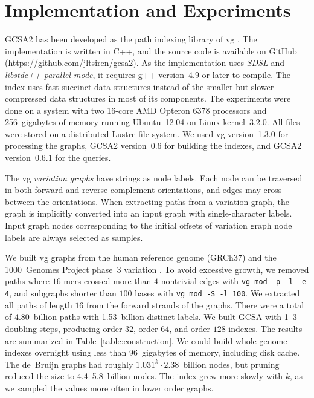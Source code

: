 \documentclass[a4paper,UKenglish]{lipics-v2016}
\newcommand{\kmer}[1]{$#1$\nobreakdash-mer}
\newcommand{\orderk}[1]{order\nobreakdash-$#1$}
\begin{document}
\section{Implementation and Experiments}

GCSA2 has been developed as the path indexing library of vg \cite{Garrison2014-2016}. The implementation is written in C++, and the source code is available on GitHub (\url{https://github.com/jltsiren/gcsa2}). As the implementation uses \emph{SDSL} \cite{Gog2014b} and \emph{libstdc++ parallel mode}, it requires g++ version~4.9 or later to compile. The index uses fast succinct data structures instead of the smaller but slower compressed data structures in most of its components. The experiments were done on a system with two 16\nobreakdash-core AMD Opteron 6378 processors and 256~gigabytes of memory running Ubuntu~12.04 on Linux kernel~3.2.0. All files were stored on a distributed Lustre file system. We used vg version~1.3.0 for processing the graphs, GCSA2 version~0.6 for building the indexes, and GCSA2 version~0.6.1 for the queries.

The vg \emph{variation graphs} have strings as node labels. Each node can be traversed in both forward and reverse complement orientations, and edges may cross between the orientations. When extracting paths from a variation graph, the graph is implicitly converted into an input graph with single-character labels. Input graph nodes corresponding to the initial offsets of variation graph node labels are always selected as samples.

We built vg graphs from the human reference genome (GRCh37) and the 1000~Genomes Project phase~3 variation \cite{1000GP2015}. To avoid excessive growth, we removed paths where \kmer{16}s crossed more than $4$ nontrivial edges with \texttt{vg mod -p -l -e 4}, and subgraphs shorter than $100$ bases with \texttt{vg mod -S -l 100}. We extracted all paths of length $16$ from the forward strands of the graphs. There were a total of 4.80~billion paths with 1.53~billion distinct labels. We built GCSA with 1\nobreakdash--3 doubling steps, producing \orderk{32}, \orderk{64}, and \orderk{128} indexes. The results are summarized in Table~\ref{table:construction}.  We could build whole-genome indexes overnight using less than 96~gigabytes of memory, including disk cache. The de~Bruijn graphs had roughly $1.031^{k} \cdot 2.38$~billion nodes, but pruning reduced the size to 4.4\nobreakdash--5.8~billion nodes. The index grew more slowly with $k$, as we sampled the values more often in lower order graphs.
\end{document}
